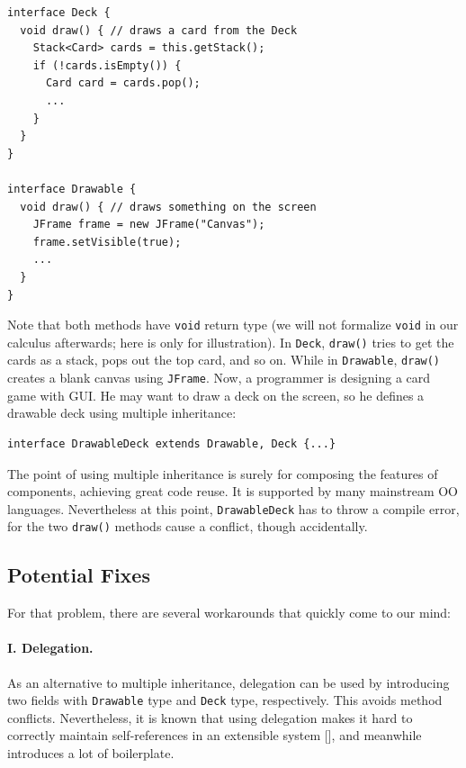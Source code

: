 \vspace{3pt}\begin{lstlisting}
interface Deck {
  void draw() { // draws a card from the Deck
    Stack<Card> cards = this.getStack();
    if (!cards.isEmpty()) {
      Card card = cards.pop();
      ...
    }
  }
}

interface Drawable {
  void draw() { // draws something on the screen
    JFrame frame = new JFrame("Canvas");
    frame.setVisible(true);
    ...
  }
}
\end{lstlisting}\vspace{3pt}
Note that both methods have \lstinline|void| return type (we will not formalize
\lstinline|void| in our calculus afterwards; here is only for illustration). In \lstinline|Deck|, \lstinline|draw()| tries to get the cards as a stack, pops
out the top card, and so on. While in \lstinline|Drawable|, \lstinline|draw()|
creates a blank canvas using \lstinline|JFrame|. Now, a programmer is designing a
card game with GUI. He may want to draw a deck on the screen, so he defines a drawable
deck using multiple inheritance:

\vspace{3pt}\begin{lstlisting}
interface DrawableDeck extends Drawable, Deck {...} 
\end{lstlisting}\vspace{3pt}
The point of using multiple inheritance is surely for composing the features of
components, achieving great code reuse. It is supported by many mainstream OO
languages. Nevertheless at this point, \lstinline|DrawableDeck| has to throw a compile
error, for the two \lstinline|draw()| methods cause a conflict, though accidentally.

\subsection{Potential Fixes}

For that problem, there are several workarounds that quickly come to our mind:

\paragraph{I. Delegation.} As an alternative to multiple inheritance, delegation can be used by
introducing two fields with \lstinline|Drawable| type and \lstinline|Deck| type, respectively. This avoids
method conflicts. Nevertheless, it is known that using delegation makes it hard to correctly maintain self-references  in an
extensible system [], and meanwhile introduces a lot of boilerplate.


